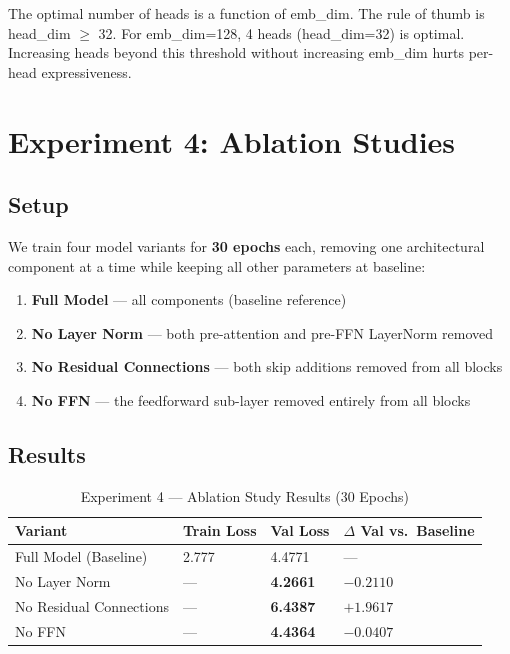 \documentclass[12pt,a4paper]{article}
\newenvironment{keyinsight}{%
  \begin{tcolorbox}[colback=lightblue!60, colframe=accentblue,
    fonttitle=\bfseries\small\color{navyblue},
    title={Key Insight}, boxrule=0.6pt,
    left=6pt, right=6pt, top=4pt, bottom=4pt]%
}{\end{tcolorbox}}
\begin{document}
\begin{keyinsight}
The optimal number of heads is a function of emb\_dim. The rule of thumb is head\_dim $\geq$ 32. For emb\_dim=128, 4 heads (head\_dim=32) is optimal. Increasing heads beyond this threshold without increasing emb\_dim hurts per-head expressiveness.
\end{keyinsight}

\section{Experiment 4: Ablation Studies}

\subsection{Setup}

We train four model variants for \textbf{30 epochs} each, removing one architectural component at a time while keeping all other parameters at baseline:

\begin{enumerate}[leftmargin=2cm]
  \item \textbf{Full Model} — all components (baseline reference)
  \item \textbf{No Layer Norm} — both pre-attention and pre-FFN LayerNorm removed
  \item \textbf{No Residual Connections} — both skip additions removed from all blocks
  \item \textbf{No FFN} — the feedforward sub-layer removed entirely from all blocks
\end{enumerate}

\subsection{Results}

\begin{table}[H]
\centering
\caption{Experiment 4 — Ablation Study Results (30 Epochs)}
\begin{tabular}{L{4cm}C{2.5cm}C{2.5cm}C{2.5cm}}
  \toprule
  \textbf{Variant} & \textbf{Train Loss} & \textbf{Val Loss} & \textbf{$\Delta$ Val vs.\ Baseline} \\
  \midrule
  Full Model (Baseline)   & 2.777 & 4.4771 & — \\
  No Layer Norm           & —     & \textbf{4.2661} & $-0.2110$ \\
  No Residual Connections & —     & \textbf{6.4387} & $+1.9617$ \\
  No FFN                  & —     & \textbf{4.4364} & $-0.0407$ \\
  \bottomrule
\end{tabular}
\end{table}
\end{document}
